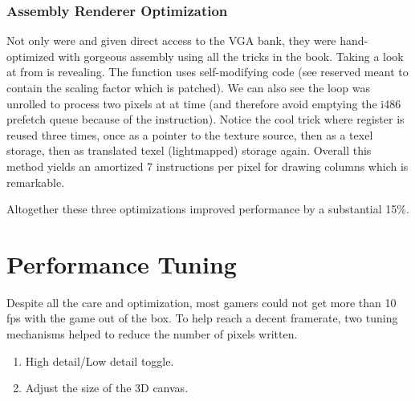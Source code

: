 \vspace{-10pt}
\subsubsection{Assembly Renderer Optimization}
Not only were  and  given direct access to the VGA bank, they were hand-optimized with gorgeous assembly using all the tricks in the book. Taking a look at  from  is revealing. The function uses self-modifying code (see reserved  meant to contain the scaling factor which is patched). We can also see the loop was unrolled to process two pixels at at time (and therefore avoid emptying the i486 prefetch queue because of the  instruction). Notice the cool trick where register  is reused three times, once as a pointer to the texture source, then as a  texel storage, then as  translated texel (lightmapped) storage again. Overall this method yields an amortized 7 instructions per pixel for drawing columns which is remarkable.\\
\par
Altogether these three optimizations improved performance by a substantial 15\%.







\vspace{-1.25cm}
\section{Performance Tuning}
Despite all the care and optimization, most gamers could not get more than 10 fps with the game out of the box. To help reach a decent framerate, two tuning mechanisms helped to reduce the number of pixels written.
\begin{enumerate}
\item High detail/Low detail toggle.
\item Adjust the size of the 3D canvas.
\end{enumerate}
\par
{}\\
\par



